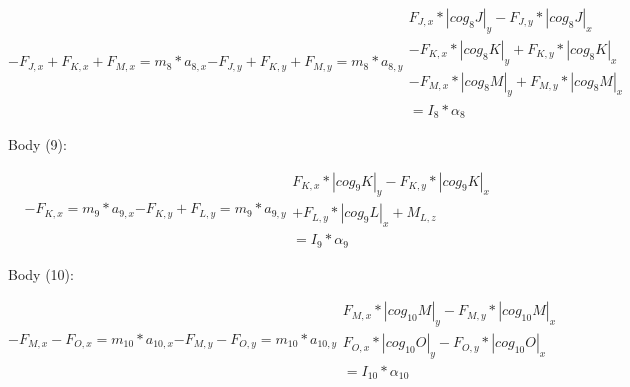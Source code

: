 \documentclass[a4paper]{article}
\begin{document}
\begin{subequations}
	\begin{equation}
		-F_{J,x}+F_{K,x}+F_{M,x}=m_8*a_{8,x}
	\end{equation}
	\begin{equation}
		-F_{J,y}+F_{K,y}+F_{M,y}=m_8*a_{8,y}
	\end{equation}
	\begin{equation}
	\begin{split}
	F_{J,x}*|cog_8J|_y-F_{J,y}*|cog_8J|_x\\-F_{K,x}*|cog_8K|_y+F_{K,y}*|cog_8K|_x\\-F_{M,x}*|cog_8M|_y+F_{M,y}*|cog_8M|_x\\=I_8*\alpha_8
	\end{split}
	\end{equation}
\end{subequations}

Body (9):

\begin{subequations}
	\begin{equation}
		-F_{K,x}=m_9*a_{9,x}
	\end{equation}
	\begin{equation}
		-F_{K,y}+F_{L,y}=m_9*a_{9,y}
	\end{equation}
	\begin{equation}
	\begin{split}
	F_{K,x}*|cog_{9}K|_y-F_{K,y}*|cog_{9}K|_x\\+F_{L,y}*|cog_{9}L|_x+M_{L,z}\\=I_{9}*\alpha_{9}
	\end{split}
	\end{equation}
\end{subequations}

Body (10):

\begin{subequations}
	\begin{equation}
		-F_{M,x}-F_{O,x}=m_{10}*a_{10,x}
	\end{equation}
	\begin{equation}
		-F_{M,y}-F_{O,y}=m_{10}*a_{10,y}
	\end{equation}
	\begin{equation}
	\begin{split}
	F_{M,x}*|cog_{10}M|_y-F_{M,y}*|cog_{10}M|_x\\F_{O,x}*|cog_{10}O|_y-F_{O,y}*|cog_{10}O|_x\\=I_{10}*\alpha_{10}
	\end{split}
	\end{equation}
\end{subequations}
\end{document}
